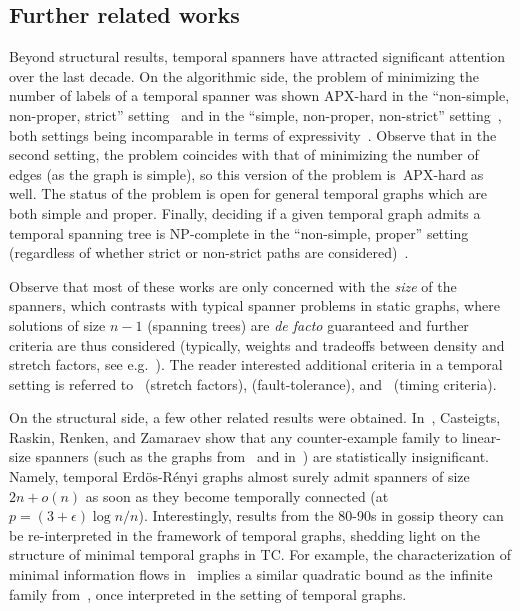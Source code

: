 \documentclass[USenglish, a4paper, thm-restate,numberwithinsect, cleveref]{lipics-v2021}
\begin{document}
\subsection{Further related works}
Beyond structural results, temporal spanners have attracted significant attention over the last decade. On the algorithmic side, the problem of minimizing the number of labels of a temporal spanner was shown \textsf{APX}-hard in the ``non-simple, non-proper, strict'' setting~\cite{AGMS17} and in the ``simple, non-proper, non-strict'' setting~\cite{AF16}, both settings being incomparable in terms of expressivity~\cite{CCS24}. Observe that in the second setting, the problem coincides with that of minimizing the number of edges (as the graph is simple), so this version of the problem is~\textsf{APX}-hard as well. The status of the problem is open for general temporal graphs which are both simple and proper. Finally, deciding if a given temporal graph admits a temporal spanning tree is \textsf{NP}-complete in the ``non-simple, proper'' setting (regardless of whether strict or non-strict paths are considered)~\cite{CC24}.

Observe that most of these works are only concerned with the \emph{size} of the spanners, which contrasts with typical spanner problems in static graphs, where solutions of size $n-1$ (spanning trees) are \emph{de facto} guaranteed and further criteria are thus considered (typically, weights and tradeoffs between density and stretch factors, see e.g.~\cite{static1,static2,static3,static4}). The reader interested additional criteria in a temporal setting is referred to~\cite{BDG+22a} (stretch factors), \cite{BDG+22b} (fault-tolerance), and~\cite{branchings} (timing criteria).

  On the structural side, a few other related results were obtained. In~\cite{CRRZ21}, Casteigts, Raskin, Renken, and Zamaraev show that any counter-example family to linear-size spanners (such as the graphs from~\cite{KKK00} and in~\cite{AF16}) are statistically insignificant. Namely, temporal Erdös-Rényi graphs almost surely admit spanners of size $2n+o(n)$ as soon as they become temporally connected (at $p=(3+\epsilon)\log n/n$).
  Interestingly, results from the 80-90s in gossip theory can be re-interpreted in the framework of temporal graphs, shedding light on the structure of minimal temporal graphs in \textsf{TC}. For example, the characterization of minimal information flows in~\cite{labahn93} implies a similar quadratic bound as the infinite family from~\cite{AF16}, once interpreted in the setting of temporal graphs.
\end{document}
